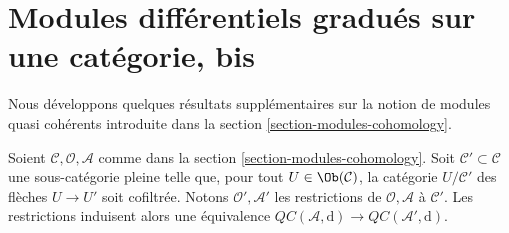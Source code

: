 \section{Modules différentiels gradués sur une catégorie, bis}
\label{section-modules-cohomology-bis}

\noindent
Nous développons quelques résultats supplémentaires sur la notion de modules quasi cohérents introduite dans la section \ref{section-modules-cohomology}.

\begin{lemma}
\label{lemma-cartesian-cofinal-subcategory}
Soient $\mathcal{C}, \mathcal{O}, \mathcal{A}$ comme dans la section \ref{section-modules-cohomology}.
Soit $\mathcal{C}' \subset \mathcal{C}$ une sous-catégorie pleine telle que, pour tout $U \in \Ob(\mathcal{C})$, la catégorie $U/\mathcal{C}'$ des flèches $U \to U'$ soit cofiltrée.
Notons $\mathcal{O}', \mathcal{A}'$ les restrictions de $\mathcal{O}, \mathcal{A}$ à $\mathcal{C}'$.
Les restrictions induisent alors une équivalence $\mathit{QC}(\mathcal{A}, \text{d}) \to \mathit{QC}(\mathcal{A}', \text{d})$.
\end{lemma}

